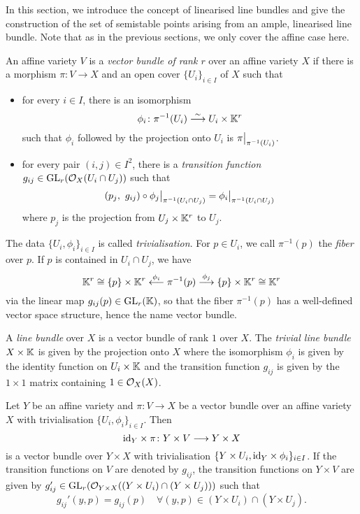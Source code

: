 In this section, we introduce the concept of linearised line bundles and give the construction of the set of semistable points arising from an ample, linearised line bundle. Note that as in the previous sections, we only cover the affine case here.

\begin{defi}
	An affine variety $V$ is a \emph{vector bundle of rank $r$} over an affine variety $X$ if there is a morphism $\pi\colon V \rightarrow X$ and an open cover $\{U_i\}_{i\in I}$ of $X$ such that
	\begin{itemize}
		\item for every $i\in I$, there is an isomorphism
			$$\phi_i\colon \pi^{-1}(U_i) \overset{\sim}{\longrightarrow} U_i \times \mathbb{K}^r$$
			such that $\phi_i$ followed by the projection onto $U_i$ is $\pi{\big |_{\pi^{-1}(U_i)}}$.
		\item for every pair $(i,j)\in I^2$, there is a \emph{transition function} $g_{ij}\in \text{GL}_r(\mathcal{O}_X(U_i\cap U_j))$ such that
		$$(p_j,\ g_{ij}) \circ \phi_j{\big |_{\pi^{-1}(U_i\cap U_j)}} =  \phi_i{\big |_{\pi^{-1}(U_i\cap U_j)}}$$
		where $p_j$ is the projection from $U_j \times \mathbb{K}^r$ to $U_j$.
	\end{itemize}
	The data $\{U_i,\phi_i\}_{i\in I}$ is called \emph{trivialisation}. For $p\in U_i$, we call $\pi^{-1}(p)$ the \emph{fiber} over $p$. If $p$ is contained in $U_i\cap U_j$, we have 
	$$\mathbb{K}^r \cong \{p\}\times \mathbb{K}^r \overset{\phi_i}{\longleftarrow} \pi^{-1}(p) \overset{\phi_j}{\longrightarrow} \{p\}\times \mathbb{K}^r \cong \mathbb{K}^r$$
	via the linear map $g_{ij}(p)\in\text{GL}_r(\mathbb{K})$, so that the fiber $\pi^{-1}(p)$ has a well-defined vector space structure, hence the name vector bundle.
	
	A \emph{line bundle} over $X$ is a vector bundle of rank $1$ over $X$. The \emph{trivial line bundle} $X\times\mathbb{K}$ is given by the projection onto $X$ where the isomorphism $\phi_i$ is given by the identity function on $U_i\times\mathbb{K}$ and the transition function $g_{ij}$ is given by the $1\times 1$ matrix containing $1\in\mathcal{O}_X(X)$.
\end{defi}

\begin{remark}
	Let $Y$ be an affine variety and $\pi\colon V \rightarrow X$ be a vector bundle over an affine variety $X$ with trivialisation $\{U_i,\phi_i\}_{i\in I}$. Then 
	$$\text{id}_Y \times \pi\colon Y\times V \longrightarrow Y\times X$$
	is a vector bundle over $Y\times X$ with trivialisation $\{Y\times U_i,\text{id}_Y \times \phi_i\}_{i\in I}$. If the transition functions on $V$ are denoted by $g_{ij}$, the transition functions on $Y\times V$ are given by
	$g_{ij}'\in \text{GL}_r(\mathcal{O}_{Y\times X}((Y\times U_i) \cap (Y \times U_j)))$ such that
	$$g_{ij}'(y,p) = g_{ij}(p)\quad \forall (y,p)\in(Y\times U_i) \cap (Y \times U_j).$$
\end{remark}

